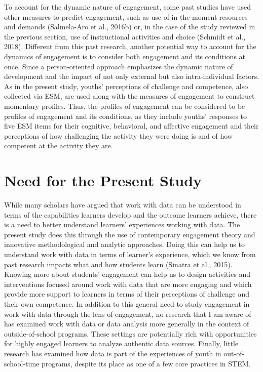 \documentclass[]{msu-thesis}
\theoremstyle{definition}
\theoremstyle{definition}
\theoremstyle{definition}
\theoremstyle{remark}
\begin{document}
To account for the dynamic nature of engagement, some past studies have
used other measures to predict engagement, such as use of in-the-moment
resources and demands (Salmela-Aro et al., 2016b) or, in the case of the
study reviewed in the previous section, use of instructional activities
and choice (Schmidt et al., 2018). Different from this past research,
another potential way to account for the dynamics of engagement is to
consider both engagement and its conditions at once. Since a
person-oriented approach emphasizes the dynamic nature of development
and the impact of not only external but also intra-individual factors.
As in the present study, youths' perceptions of challenge and
competence, also collected via ESM, are used along with the measures of
engagement to construct momentary profiles. Thus, the profiles of
engagement can be considered to be profiles of engagement and its
conditions, as they include youths' responses to five ESM items for
their cognitive, behavioral, and affective engagement and their
perceptions of how challenging the activity they were doing is and of
how competent at the activity they are.

\section{Need for the Present Study}\label{need-for-the-present-study}

While many scholars have argued that work with data can be understood in
terms of the capabilities learners develop and the outcome learners
achieve, there is a need to better understand learners' experiences
working with data. The present study does this through the use of
contemporary engagement theory and innovative methodological and
analytic approaches. Doing this can help us to understand work with data
in terms of learner's experience, which we know from past research
impacts what and how students learn (Sinatra et al., 2015). Knowing more
about students' engagement can help us to design activities and
interventions focused around work with data that are more engaging and
which provide more support to learners in terms of their perceptions of
challenge and their own competence. In addition to this general need to
study engagement in work with data through the lens of engagement, no
research that I am aware of has examined work with data or data analysis
more generally in the context of outside-of-school programs. These
settings are potentially rich with opportunities for highly engaged
learners to analyze authentic data sources. Finally, little research has
examined how data is part of the experiences of youth in
out-of-school-time programs, despite its place as one of a few core
practices in STEM.
\end{document}
